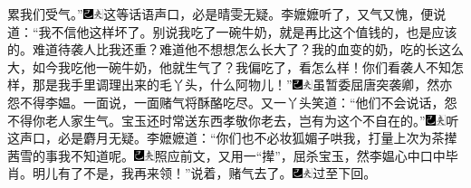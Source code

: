 累我们受气。”{\includegraphics[width=3mm]{../Images/00003}\includegraphics[width=3mm]{../Images/00012}\footnotesize \kaishu 这等话语声口，必是晴雯无疑。}李嬷嬷听了，又气又愧，便说道：“我不信他这样坏了。别说我吃了一碗牛奶，就是再比这个值钱的，也是应该的。难道待袭人比我还重？难道他不想想怎么长大了？我的血变的奶，吃的长这么大，如今我吃他一碗牛奶，他就生气了？我偏吃了，看怎么样！你们看袭人不知怎样，那是我手里调理出来的毛丫头，什么阿物儿！”{\includegraphics[width=3mm]{../Images/00003}\includegraphics[width=3mm]{../Images/00012}\footnotesize \kaishu 虽暂委屈唐突袭卿，然亦怨不得李媪。}一面说，一面赌气将酥酪吃尽。又一丫头笑道：“他们不会说话，怨不得你老人家生气。宝玉还时常送东西孝敬你老去，岂有为这个不自在的。”{\includegraphics[width=3mm]{../Images/00003}\includegraphics[width=3mm]{../Images/00012}\footnotesize \kaishu 听这声口，必是麝月无疑。}李嬷嬷道：“你们也不必妆狐媚子哄我，打量上次为茶撵茜雪的事我不知道呢。{\includegraphics[width=3mm]{../Images/00003}\includegraphics[width=3mm]{../Images/00012}\footnotesize \kaishu 照应前文，又用一“撵”，屈杀宝玉，然李媪心中口中毕肖。}明儿有了不是，我再来领！”说着，赌气去了。{\includegraphics[width=3mm]{../Images/00003}\includegraphics[width=3mm]{../Images/00012}\footnotesize \kaishu 过至下回。}

